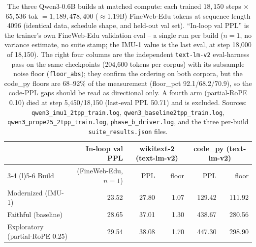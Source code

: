 \begin{table}[t]
\centering
\small
\begin{tabular}{@{}lrrrrr@{}}
\toprule
 & In-loop val PPL & \multicolumn{2}{c}{wikitext-2 (text-lm-v2)} & \multicolumn{2}{c}{code\_py (text-lm-v2)} \\
\cmidrule(lr){3-4} \cmidrule(l){5-6}
Build & (FineWeb-Edu, $n{=}1$) & PPL & floor & PPL & floor \\
\midrule
Modernized (IMU-1)            & 23.52 & 27.80 & 1.07  & 129.42 & 111.92 \\
Faithful (baseline)           & 28.65 & 37.01 & 1.30  & 438.67 & 280.56 \\
Exploratory (partial-RoPE 0.25) & 29.54 & 38.08 & 1.70  & 447.30 & 298.90 \\
\bottomrule
\end{tabular}
\caption{The three Qwen3-0.6B builds at matched compute: each trained
$18{,}150$ steps $\times$ $65{,}536$ tok $= 1{,}189{,}478{,}400$
($\approx$1.19B) FineWeb-Edu tokens at sequence length 4096 (identical data,
schedule shape, and held-out val set). ``In-loop val PPL'' is the trainer's
own FineWeb-Edu validation eval -- a single run per build ($n{=}1$, no
variance estimate, no suite stamp; the IMU-1 value is the last eval, at step
18{,}000 of 18{,}150). The right four columns are the independent
\texttt{text-lm-v2} eval-harness pass on the same checkpoints (204{,}600
tokens per corpus) with its subsample noise floor (\texttt{floor\_abs});
they confirm the ordering on both corpora, but the code\_py floors are
68--92\% of the measurement (floor\_pct 92.1/68.2/70.9), so the code-PPL
gaps should be read as directional only. A fourth arm (partial-RoPE 0.10)
died at step 5{,}450/18{,}150 (last-eval PPL 50.71) and is excluded.
Sources: \texttt{qwen3\_imu1\_2tpp\_train.log},
\texttt{qwen3\_baseline2tpp\_train.log},
\texttt{qwen3\_prope25\_2tpp\_train.log}, \texttt{phase\_b\_driver.log},
and the three per-build \texttt{suite\_results.json} files.}
\label{tab:arms}
\end{table}
